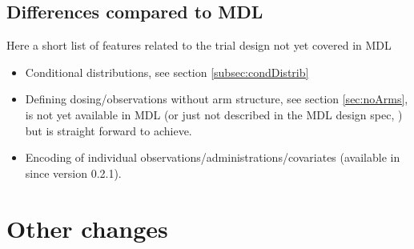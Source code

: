 \section{Differences compared to MDL}
Here a short list of features related to the trial design not yet covered in MDL
\begin{itemize}	
\item 
Conditional distributions, see section \ref{subsec:condDistrib}
\item 
Defining dosing/observations without arm structure, see section \ref{sec:noArms},
is not yet available in MDL (or just not described in the MDL design spec,
\cite{Commets2015} ) but is straight forward to achieve.
\item 
Encoding of individual observations/administrations/covariates (available in \pml since 
version 0.2.1).\
\end{itemize}




%
%

\chapter{Other changes}
\label{ch:otherChanges}

